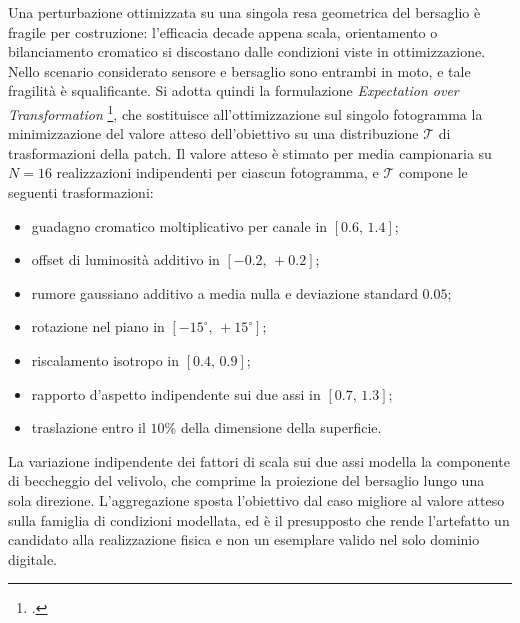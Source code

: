 \documentclass[a4paper,12pt]{report}
\begin{document}
Una perturbazione ottimizzata su una singola resa geometrica del bersaglio è
fragile per costruzione: l'efficacia decade appena scala, orientamento o
bilanciamento cromatico si discostano dalle condizioni viste in ottimizzazione.
Nello scenario considerato sensore e bersaglio sono entrambi in moto, e tale
fragilità è squalificante. Si adotta quindi la formulazione \textit{Expectation
over Transformation} \footcite{athalye_2018_eot}, che sostituisce
all'ottimizzazione sul singolo fotogramma la minimizzazione del valore atteso
dell'obiettivo su una distribuzione $\mathcal{T}$ di trasformazioni della patch.
Il valore atteso è stimato per media campionaria su $N = 16$ realizzazioni
indipendenti per ciascun fotogramma, e $\mathcal{T}$ compone le seguenti
trasformazioni:
\begin{itemize}
    \item guadagno cromatico moltiplicativo per canale in $[0.6,\, 1.4]$;
    \item offset di luminosità additivo in $[-0.2,\, +0.2]$;
    \item rumore gaussiano additivo a media nulla e deviazione standard $0.05$;
    \item rotazione nel piano in $[-15^\circ,\, +15^\circ]$;
    \item riscalamento isotropo in $[0.4,\, 0.9]$;
    \item rapporto d'aspetto indipendente sui due assi in $[0.7,\, 1.3]$;
    \item traslazione entro il $10\%$ della dimensione della superficie.
\end{itemize}
La variazione indipendente dei fattori di scala sui due assi modella la
componente di beccheggio del velivolo, che comprime la proiezione del bersaglio
lungo una sola direzione. L'aggregazione sposta l'obiettivo dal caso migliore al
valore atteso sulla famiglia di condizioni modellata, ed è il presupposto che
rende l'artefatto un candidato alla realizzazione fisica e non un esemplare
valido nel solo dominio digitale.
\end{document}
